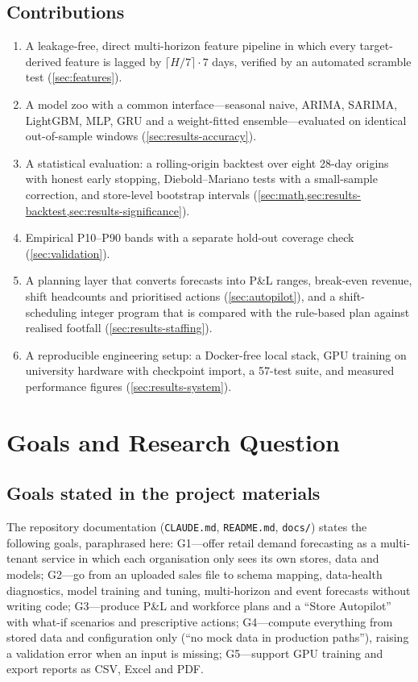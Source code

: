 \documentclass[conference]{IEEEtran}
\newcommand{\code}[1]{\texttt{\small #1}}
\begin{document}
\subsection{Contributions}
\begin{enumerate}
\item A leakage-free, direct multi-horizon feature pipeline in which every target-derived feature is
  lagged by $\lceil H/7\rceil\cdot 7$ days, verified by an automated scramble test (\cref{sec:features}).
\item A model zoo with a common interface---seasonal naive, ARIMA, SARIMA, LightGBM, MLP, GRU and a
  weight-fitted ensemble---evaluated on identical out-of-sample windows (\cref{sec:results-accuracy}).
\item A statistical evaluation: a rolling-origin backtest over eight 28-day origins with honest
  early stopping, Diebold--Mariano tests with a small-sample correction, and store-level bootstrap
  intervals (\cref{sec:math,sec:results-backtest,sec:results-significance}).
\item Empirical P10--P90 bands with a separate hold-out coverage check (\cref{sec:validation}).
\item A planning layer that converts forecasts into P\&L ranges, break-even revenue, shift
  headcounts and prioritised actions (\cref{sec:autopilot}), and a shift-scheduling integer program
  that is compared with the rule-based plan against realised footfall (\cref{sec:results-staffing}).
\item A reproducible engineering setup: a Docker-free local stack, GPU training on university
  hardware with checkpoint import, a 57-test suite, and measured performance figures
  (\cref{sec:results-system}).
\end{enumerate}

\section{Goals and Research Question}\label{sec:rq}

\subsection{Goals stated in the project materials}
The repository documentation (\code{CLAUDE.md}, \code{README.md}, \code{docs/}) states the following
goals, paraphrased here: G1---offer retail demand forecasting as a multi-tenant service in which
each organisation only sees its own stores, data and models; G2---go from an uploaded sales file to
schema mapping, data-health diagnostics, model training and tuning, multi-horizon and event
forecasts without writing code; G3---produce P\&L and workforce plans and a ``Store Autopilot''
with what-if scenarios and prescriptive actions; G4---compute everything from stored data and
configuration only (``no mock data in production paths''), raising a validation error when an input
is missing; G5---support GPU training and export reports as CSV, Excel and PDF.
\end{document}
